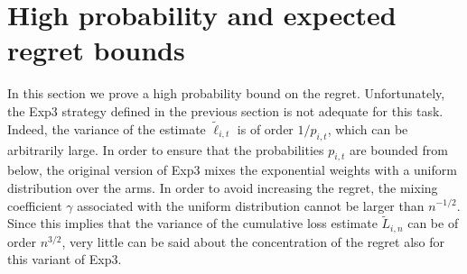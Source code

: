 \section{High probability and expected regret bounds} \label{sec:regret}
In this section we prove a high probability bound on the regret. Unfortunately, the Exp3 strategy defined in the previous section is not adequate for this task. Indeed, the variance of the estimate $\tilde{\ell}_{i,t}$ is of order $1/p_{i,t}$, which can be arbitrarily large. In order to ensure that the probabilities $p_{i,t}$ are bounded from below, the original version of Exp3 mixes the exponential weights with a uniform distribution over the arms. In order to avoid increasing the regret, the mixing coefficient $\gamma$ associated with the uniform distribution cannot be larger than $n^{-1/2}$. Since this implies that the variance of the cumulative loss estimate $\tilde{L}_{i,n}$ can be of order $n^{3/2}$, very little can be said about the concentration of the regret also for this variant of Exp3.

